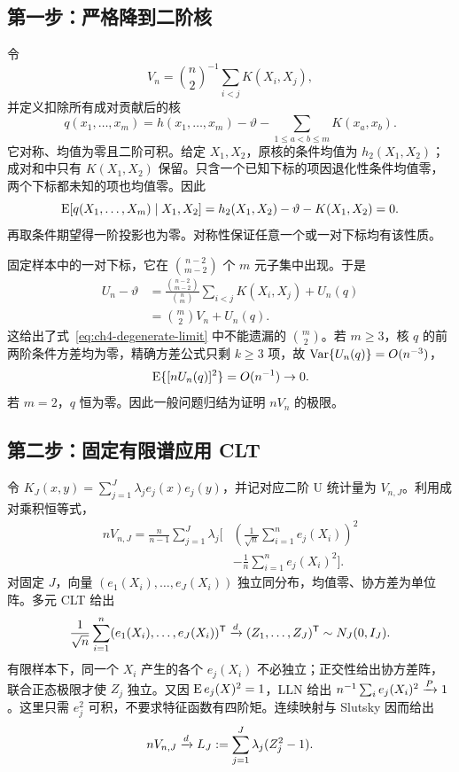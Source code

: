 \subsection{第一步：严格降到二阶核}

令
\[
 V_n=\binom n2^{-1}\sum_{i<j}K(X_i,X_j),
\]
并定义扣除所有成对贡献后的核
\[
 q(x_1,\ldots,x_m)=h(x_1,\ldots,x_m)-\vartheta
                  -\sum_{1\leq a<b\leq m}K(x_a,x_b).
\]
它对称、均值为零且二阶可积。给定 $X_1,X_2$，原核的条件均值为 $h_2(X_1,X_2)$；成对和中只有 $K(X_1,X_2)$ 保留。只含一个已知下标的项因退化性条件均值零，两个下标都未知的项也均值零。因此
\[
 \operatorname{E}[q(X_1,\ldots,X_m)\mid X_1,X_2]
 =h_2(X_1,X_2)-\vartheta-K(X_1,X_2)=0.
\]
再取条件期望得一阶投影也为零。对称性保证任意一个或一对下标均有该性质。

固定样本中的一对下标，它在 $\binom{n-2}{m-2}$ 个 $m$ 元子集中出现。于是
\begin{align*}
 U_n-\vartheta
 &=\frac{\binom{n-2}{m-2}}{\binom nm}
       \sum_{i<j}K(X_i,X_j)+U_n(q)\\
 &=\binom m2V_n+U_n(q).
\end{align*}
这给出了式~\eqref{eq:ch4-degenerate-limit} 中不能遗漏的 $\binom m2$。若 $m\geq3$，核 $q$ 的前两阶条件方差均为零，精确方差公式只剩 $k\geq3$ 项，故 $\operatorname{Var}\{U_n(q)\}=O(n^{-3})$，
\[
 \operatorname{E}\{[nU_n(q)]^2\}=O(n^{-1})\to0.
\]
若 $m=2$，$q$ 恒为零。因此一般问题归结为证明 $nV_n$ 的极限。

\subsection{第二步：固定有限谱应用 CLT}

令 $K_J(x,y)=\sum_{j=1}^J\lambda_je_j(x)e_j(y)$，并记对应二阶 U 统计量为 $V_{n,J}$。利用成对乘积恒等式，
\begin{equation}
 \begin{split}
 nV_{n,J}=\frac n{n-1}\sum_{j=1}^J\lambda_j
 \bigg[&\left(\frac1{\sqrt n}\sum_{i=1}^ne_j(X_i)\right)^2\\
       &-\frac1n\sum_{i=1}^ne_j(X_i)^2\bigg].
 \end{split}
 \label{eq:ch4-finite-spectrum}
\end{equation}
对固定 $J$，向量 $(e_1(X_i),\ldots,e_J(X_i))$ 独立同分布，均值零、协方差为单位阵。多元 CLT 给出
\[
 \frac1{\sqrt n}\sum_{i=1}^n
 (e_1(X_i),\ldots,e_J(X_i))^\mathsf T
 \xrightarrow{d} (Z_1,\ldots,Z_J)^\mathsf T\sim N_J(0,I_J).
\]
有限样本下，同一个 $X_i$ 产生的各个 $e_j(X_i)$ 不必独立；正交性给出协方差阵，联合正态极限才使 $Z_j$ 独立。又因 $\operatorname{E} e_j(X)^2=1$，LLN 给出 $n^{-1}\sum_ie_j(X_i)^2\xrightarrow{P}1$。这里只需 $e_j^2$ 可积，不要求特征函数有四阶矩。连续映射与 Slutsky 因而给出
\[
 nV_{n,J}\xrightarrow{d} L_J:=\sum_{j=1}^J\lambda_j(Z_j^2-1).
\]

